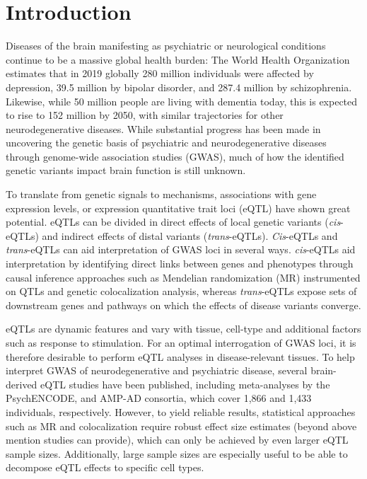 \section{Introduction}
Diseases of the brain manifesting as psychiatric or neurological conditions continue to be a massive global health burden: The World Health Organization estimates that in 2019 globally 280 million individuals were affected by depression, 39.5 million by bipolar disorder, and 287.4 million by schizophrenia\cite{vosGlobalBurden3692020}. Likewise, while 50 million people are living with dementia today, this is expected to rise to 152 million by 2050\cite{WorldAlzheimerReport2018}, with similar trajectories for other neurodegenerative diseases. While substantial progress has been made in uncovering the genetic basis of psychiatric and neurodegenerative diseases through genome-wide association studies (GWAS), much of how the identified genetic variants impact brain function is still unknown.

To translate from genetic signals to mechanisms, associations with gene expression levels, or expression quantitative trait loci (eQTL) have shown great potential. eQTLs can be divided in direct effects of local genetic variants (\textit{cis}-eQTLs) and indirect effects of distal variants (\textit{trans}-eQTLs). \textit{Cis}-eQTLs and \textit{trans}-eQTLs can aid interpretation of GWAS loci in several ways. \textit{cis}-eQTLs aid interpretation by identifying direct links between genes and phenotypes through causal inference approaches such as Mendelian randomization (MR) instrumented on QTLs and genetic colocalization analysis, whereas \textit{trans}-eQTLs expose sets of downstream genes and pathways on which the effects of disease variants converge.  

eQTLs are dynamic features and vary with tissue, cell-type and additional factors such as response to stimulation. For an optimal interrogation of GWAS loci, it is therefore desirable to perform eQTL analyses in disease-relevant tissues\cite{donovanCellularDeconvolutionGTEx2020}. To help interpret GWAS of neurodegenerative and psychiatric disease, several brain-derived eQTL studies have been published, including meta-analyses by the PsychENCODE\cite{wangComprehensiveFunctionalGenomic2018}, and AMP-AD\cite{rajIntegrativeTranscriptomeAnalyses2018} consortia, which cover 1,866 and 1,433 individuals, respectively. However, to yield reliable results, statistical approaches such as MR and colocalization require robust effect size estimates (beyond above mention studies can provide), which can only be achieved by even larger eQTL sample sizes. Additionally, large sample sizes are especially useful to be able to decompose eQTL effects to specific cell types. 

